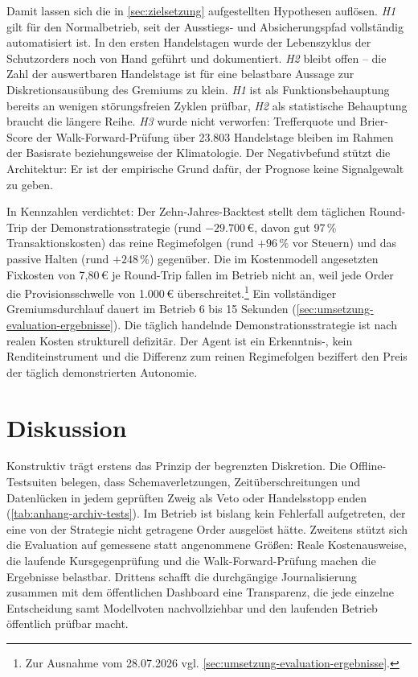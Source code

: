 Damit lassen sich die in \cref{sec:zielsetzung} aufgestellten Hypothesen
auflösen. \emph{H1} gilt für den Normalbetrieb, seit der Ausstiegs- und Absicherungspfad vollständig
automatisiert ist. In den ersten Handelstagen wurde der Lebenszyklus der Schutzorders noch
von Hand geführt und dokumentiert. \emph{H2} bleibt offen --
die Zahl der auswertbaren Handelstage ist für eine belastbare Aussage zur
Diskretionsausübung des Gremiums zu klein. \emph{H1} ist als Funktionsbehauptung bereits an wenigen störungsfreien Zyklen prüfbar, \emph{H2} als statistische Behauptung braucht die längere Reihe. \emph{H3}
wurde nicht verworfen: Trefferquote und Brier-Score der Walk-Forward-Prüfung über
23.803 Handelstage bleiben im Rahmen der Basisrate beziehungsweise der
Klimatologie. Der Negativbefund stützt die Architektur: Er ist der empirische Grund dafür, der Prognose keine Signalgewalt zu geben.

In Kennzahlen verdichtet: Der Zehn-Jahres-Backtest stellt dem täglichen
Round-Trip der Demonstrationsstrategie (rund $-29.700$\,€, davon gut 97\,\%
Transaktionskosten) das reine Regimefolgen (rund $+96\,\%$ vor Steuern) und das
passive Halten (rund $+248\,\%$) gegenüber. Die im Kostenmodell angesetzten Fixkosten von 7,80\,€ je Round-Trip fallen im Betrieb nicht an, weil jede Order die Provisionsschwelle von 1.000\,€ überschreitet.\footnote{Zur Ausnahme vom 28.07.2026 vgl. \cref{sec:umsetzung-evaluation-ergebnisse}.} Ein vollständiger
Gremiumsdurchlauf dauert im Betrieb 6 bis 15 Sekunden
(\cref{sec:umsetzung-evaluation-ergebnisse}). Die täglich handelnde Demonstrationsstrategie ist nach realen
Kosten strukturell defizitär. Der Agent ist ein Erkenntnis-, kein
Renditeinstrument und die Differenz zum reinen Regimefolgen beziffert den Preis
der täglich demonstrierten Autonomie.

\section{Diskussion}
\label{sec:diskussion}

Konstruktiv trägt erstens das Prinzip der begrenzten Diskretion. Die Offline-Testsuiten
belegen, dass Schemaverletzungen, Zeitüberschreitungen und Datenlücken in jedem geprüften
Zweig als Veto oder Handelsstopp enden (\cref{tab:anhang-archiv-tests}). Im Betrieb ist
bislang kein Fehlerfall aufgetreten, der eine von der Strategie nicht getragene Order ausgelöst hätte.
Zweitens stützt sich die Evaluation auf gemessene statt angenommene Größen: Reale Kostenausweise, die laufende
Kursgegenprüfung und die Walk-Forward-Prüfung machen die Ergebnisse belastbar. Drittens schafft die durchgängige
Journalisierung zusammen mit dem öffentlichen Dashboard eine Transparenz, die
jede einzelne Entscheidung samt Modellvoten nachvollziehbar und den laufenden
Betrieb öffentlich prüfbar macht.

